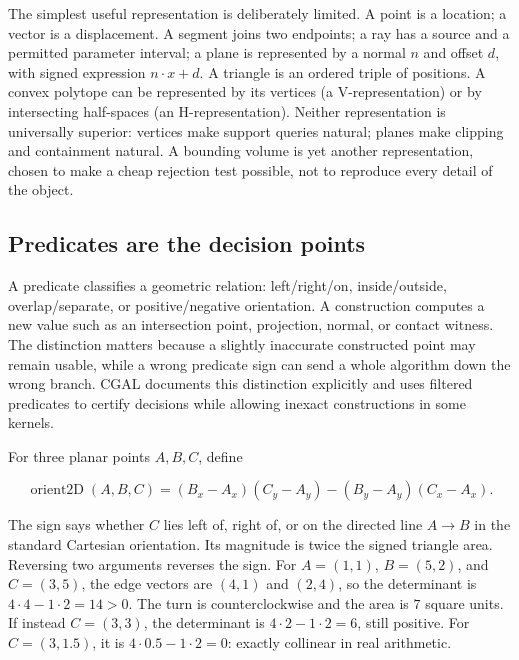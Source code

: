 The simplest useful representation is deliberately limited. A point is a location; a vector is a displacement. A segment joins two endpoints; a ray has a source and a permitted parameter interval; a plane is represented by a normal \(n\) and offset \(d\), with signed expression \(n\cdot x+d\). A triangle is an ordered triple of positions. A convex polytope can be represented by its vertices (a V-representation) or by intersecting half-spaces (an H-representation). Neither representation is universally superior: vertices make support queries natural; planes make clipping and containment natural. A bounding volume is yet another representation, chosen to make a cheap rejection test possible, not to reproduce every detail of the object.

\subsection{Predicates are the decision points}\label{03-visual-computing-i-ch020-predicates-are-the-decision-points}

\hypertarget{03-visual-computing-i-ch020-predicates-are-the-decision-points}{}

A predicate classifies a geometric relation: left/right/on, inside/outside, overlap/separate, or positive/negative orientation. A construction computes a new value such as an intersection point, projection, normal, or contact witness. The distinction matters because a slightly inaccurate constructed point may remain usable, while a wrong predicate sign can send a whole algorithm down the wrong branch. CGAL documents this distinction explicitly and uses filtered predicates to certify decisions while allowing inexact constructions in some kernels.

For three planar points \(A,B,C\), define

\[
\operatorname{orient2D}(A,B,C)=(B_x-A_x)(C_y-A_y)-(B_y-A_y)(C_x-A_x).
\]

The sign says whether \(C\) lies left of, right of, or on the directed line \(A\rightarrow B\) in the standard Cartesian orientation. Its magnitude is twice the signed triangle area. Reversing two arguments reverses the sign. For \(A=(1,1)\), \(B=(5,2)\), and \(C=(3,5)\), the edge vectors are \((4,1)\) and \((2,4)\), so the determinant is \(4\cdot4-1\cdot2=14>0\). The turn is counterclockwise and the area is \(7\) square units. If instead \(C=(3,3)\), the determinant is \(4\cdot2-1\cdot2=6\), still positive. For \(C=(3,1.5)\), it is \(4\cdot0.5-1\cdot2=0\): exactly collinear in real arithmetic.

